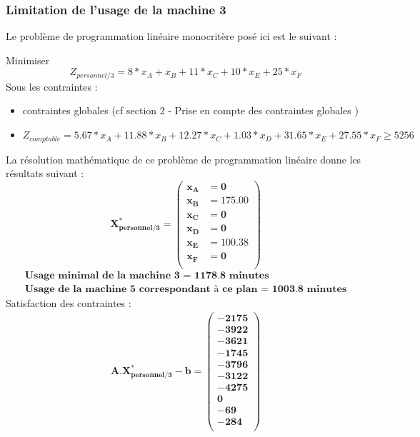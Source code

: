 \documentclass[12pt]{article}
\begin{document}
\subsubsection{Limitation de l'usage de la machine 3}
Le problème de programmation linéaire monocritère posé ici est le suivant :
\begin{tcolorbox}
Minimiser
\begin{equation*}
 Z_{personnel/3}= 8*x_{A} + x_{B} + 11*x_{C} + 10*x_{E} + 25*x_{F}
\end{equation*}
Sous les contraintes :
\begin{itemize}
\item contraintes globales (cf section 2 - Prise en compte des contraintes globales )
\item $ Z_{comptable}= 5.67*x_{A} +11.88*x_{B} +12.27*x_{C} +1.03*x_{D} +31.65*x_{E} +27.55*x_{F} \geq 5256$
\end{itemize}
\end{tcolorbox}
La résolution mathématique de ce problème de programmation linéaire donne les résultats suivant :\\
\begin{equation*}
\boldsymbol{X^{*}_{personnel/3} = 
   \left (
   \begin{aligned}
      x_{A} &= 0 \\
      x_{B} &= 175.00 \\
      x_{C} &= 0 \\
      x_{D} &= 0 \\
      x_{E} &= 100.38 \\ 
      x_{F} &= 0 \\
   \end{aligned}
   \right )
 } 
\end{equation*}
\begin{align*}
\textbf{Usage minimal de la machine 3 = 1178.8 minutes}\\
\textbf{Usage de la machine 5 correspondant à ce plan = 1003.8 minutes}
\end{align*}
Satisfaction des contraintes : 
\begin{align*}
\boldsymbol{A.X^{*}_{personnel/3} - b = 
   \left (
   \begin{aligned}
      -2175 \\
      -3922 \\
      -3621 \\
      -1745 \\
      -3796 \\
      -3122 \\
      -4275 \\
      0 \\
      -69 \\
      -284\\
   \end{aligned}
   \right )
 } 
\end{align*}
\end{document}
